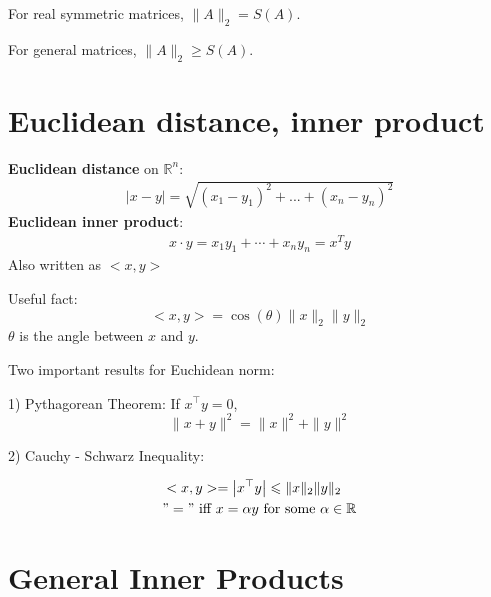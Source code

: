 \documentclass[11pt]{elegantbook}
\begin{document}
For real symmetric matrices, $\|A\|_2=S(A)$.

For general matrices, $\|A\|_2\geq S(A)$.

\section{ Euclidean distance, inner product}
\textbf{Euclidean distance} on $\mathbb{R}^n$:
\begin{equation}
    \begin{aligned}
        |x-y|=\sqrt{(x_1-y_1)^2+...+(x_n-y_n)^2}
    \end{aligned}
    \nonumber
\end{equation}
\textbf{Euclidean inner product}:
\begin{equation}
    \begin{aligned}
        x\cdot y=x_1y_1+\cdots +x_ny_n=x^Ty
    \end{aligned}
    \nonumber
\end{equation}
Also written as $<x,y>$

Useful fact: $$<x,y>=\cos(\theta)\|x\|_2\|y\|_2$$
$\theta$ is the angle between $x$ and $y$.

Two important results for Euchidean norm:

1) Pythagorean Theorem: If $x^{\top} y=0$,
\[ \|x+y\|^{2}=\|x\|^{2}+\|y\|^{2} \]

2) Cauchy - Schwarz Inequality:

$$
\begin{aligned}
&<x,y>=\left|x^{\top} y\right| \leqslant\|x\|_2\|y\|_2 \\
&"=" \text { iff } x=\alpha y \text { for some } \alpha \in \mathbb{R}
\end{aligned}
$$

\section{General Inner Products}
\end{document}
